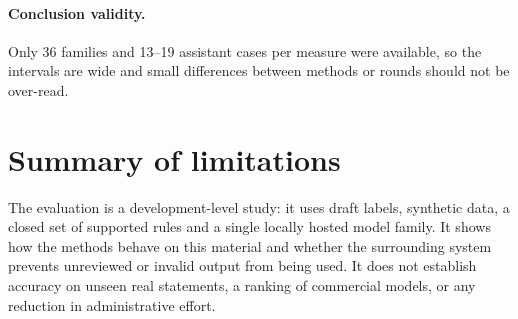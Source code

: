 \paragraph{Conclusion validity.} Only 36 families and 13--19 assistant cases per measure were available, so the intervals are wide and small differences between methods or rounds should not be over-read.

\section{Summary of limitations}\label{feasibility-risks-and-limitations}

The evaluation is a development-level study: it uses draft labels, synthetic data, a closed set of supported rules and a single locally hosted model family. It shows how the methods behave on this material and whether the surrounding system prevents unreviewed or invalid output from being used. It does not establish accuracy on unseen real statements, a ranking of commercial models, or any reduction in administrative effort.
